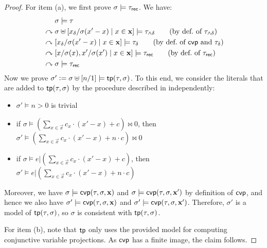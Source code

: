 {\begin{proof}
    For item (a), we first prove $\sigma \models \tau_{\mathsf{rec}}$.
    We have:
    \begin{align*}
                             & \sigma \models \tau                                                                                                          \\
      {} \curvearrowright {} & \sigma \uplus [x_\delta / \sigma(x'-x) \mid x \in \vec{x}] \models \tau_{\land\delta} \tag{by def.\ of $\tau_{\land\delta}$} \\
      {} \curvearrowright {} & [x_\delta / \sigma(x'-x) \mid x \in \vec{x}] \models \tau_\delta \tag{by def.\ of $\mbp$ and $\tau_{\delta}$}                \\
      {} \curvearrowright {} & [x/\sigma(x),x'/\sigma(x') \mid x \in \vec{x}] \models \tau_\rec \tag{by def.\ of $\tau_{\rec}$}                             \\
      {} \curvearrowright {} & \sigma \models \tau_\rec
    \end{align*}
    Now we prove
    $\sigma' \mathrel{\mathop:}= \sigma \uplus [n/1] \models \mathsf{tp}(\tau,\sigma)$.
    To this end, we consider the literals that are added to $\mathsf{tp}(\tau,\sigma)$ by the procedure described in  independently:
    \begin{itemize}
      \item $\sigma' \models n > 0$ is trivial
      \item if $\sigma \models (\sum_{x \in \vec{x}} c_x \cdot (x'-x) + c) \bowtie 0$, then $\sigma' \models (\sum_{x \in \vec{x}} c_x \cdot (x'-x) + n \cdot c) \bowtie 0$
      \item if $\sigma \models e|(\sum_{x \in \vec{x}} c_x \cdot (x'-x) + c)$, then $\sigma' \models e|(\sum_{x \in \vec{x}} c_x \cdot (x'-x) + n \cdot c)$
    \end{itemize}
    Moreover, we have $\sigma \models \mathsf{cvp}(\tau,\sigma,\bm{\mathrm{x}})$ and $\sigma \models \mathsf{cvp}(\tau,\sigma,\bm{\mathrm{x}}')$ by definition of $\mathsf{cvp}$, and hence we also have $\sigma' \models \mathsf{cvp}(\tau,\sigma,\bm{\mathrm{x}})$ and $\sigma' \models \mathsf{cvp}(\tau,\sigma,\bm{\mathrm{x}}')$.
    Therefore, $\sigma'$ is a model of $\mathsf{tp}(\tau,\sigma)$, so $\sigma$ is consistent with $\mathsf{tp}(\tau,\sigma)$.

    For item (b), note that $\mathsf{tp}$ only uses the provided model for computing conjunctive variable projections.
    As $\mathsf{cvp}$ has a finite image, the claim follows.


\end{proof}}
